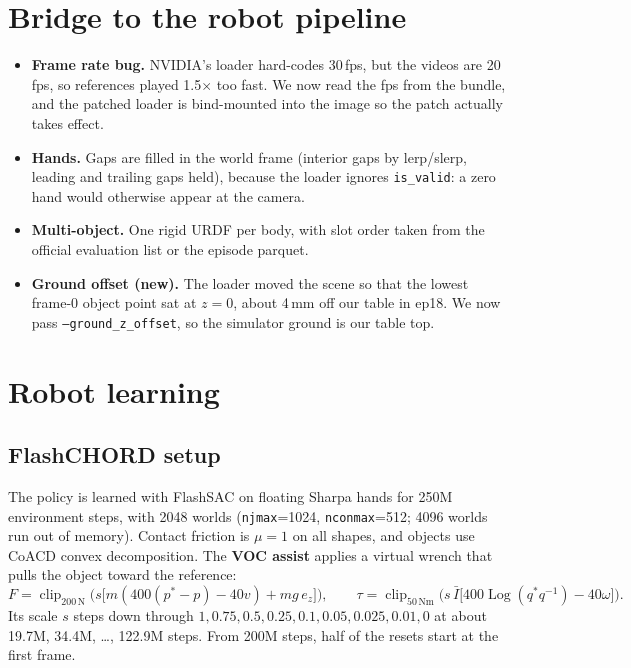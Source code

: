 \documentclass[10pt,a4paper]{article}
\newcommand{\Log}{\operatorname{Log}}
\newcommand{\clip}{\operatorname{clip}}
\begin{document}
\section{Bridge to the robot pipeline}
\begin{itemize}
\item \textbf{Frame rate bug.} NVIDIA's loader hard-codes 30\,fps, but the videos are 20\,fps, so references played 1.5$\times$ too fast. We now read the fps from the
bundle, and the patched loader is bind-mounted into the image so the patch actually takes effect.
\item \textbf{Hands.} Gaps are filled in the world frame (interior gaps by lerp/slerp, leading and trailing gaps held), because the loader ignores
\texttt{is\_valid}: a zero hand would otherwise appear at the camera.
\item \textbf{Multi-object.} One rigid URDF per body, with slot order taken from the official evaluation list or the episode parquet.
\item \textbf{Ground offset (new).} The loader moved the scene so that the lowest frame-0 object point sat at $z=0$, about 4\,mm off our table in ep18. We now pass
\texttt{--ground\_z\_offset}, so the simulator ground is our table top.
\end{itemize}

\section{Robot learning}
\subsection{FlashCHORD setup}
The policy is learned with FlashSAC on floating Sharpa hands for 250M environment steps, with 2048 worlds (\texttt{njmax}=1024, \texttt{nconmax}=512; 4096 worlds run out of memory).
Contact friction is $\mu=1$ on all shapes, and objects use CoACD convex decomposition. The \textbf{VOC assist} applies a virtual wrench that pulls the object toward
the reference:
\begin{equation}
F=\clip_{200\,\mathrm N}\!\Big(s\big[m(400(p^*-p)-40v)+mg\,e_z\big]\Big),\qquad
\tau=\clip_{50\,\mathrm{Nm}}\!\Big(s\,\bar I\big[400\Log(q^*q^{-1})-40\omega\big]\Big).
\end{equation}
Its scale $s$ steps down through $1,0.75,0.5,0.25,0.1,0.05,0.025,0.01,0$ at about 19.7M, 34.4M, \dots, 122.9M steps. From 200M steps, half of the resets start
at the first frame.
\end{document}
